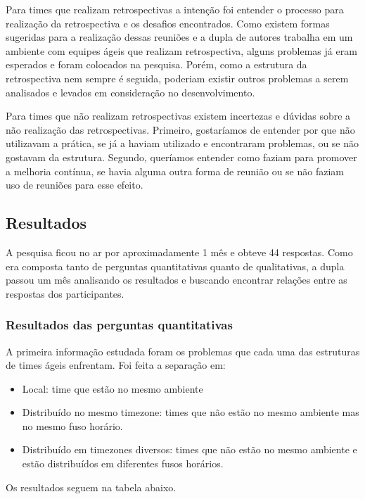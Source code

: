 Para times que realizam retrospectivas a intenção foi entender o processo para realização da retrospectiva e os desafios encontrados. Como existem formas sugeridas para a realização dessas reuniões e a dupla de autores trabalha em um ambiente com equipes ágeis que realizam retrospectiva, alguns problemas já eram esperados e foram colocados na pesquisa. Porém, como a estrutura da retrospectiva nem sempre é seguida, poderiam existir outros problemas a serem analisados e levados em consideração no desenvolvimento.

Para times que não realizam retrospectivas existem incertezas e dúvidas sobre a não realização das retrospectivas. Primeiro, gostaríamos de entender por que não utilizavam a prática, se já a haviam utilizado e encontraram problemas, ou se não gostavam da estrutura. Segundo, queríamos entender como faziam para promover a melhoria contínua, se havia alguma outra forma de reunião ou se não faziam uso de reuniões para esse efeito.

\subsection{Resultados}

A pesquisa ficou no ar por aproximadamente 1 mês e obteve 44 respostas. Como era composta tanto de perguntas quantitativas quanto de qualitativas, a dupla passou um mês analisando os resultados e buscando encontrar relações entre as respostas dos participantes.

\subsubsection*{Resultados das perguntas quantitativas}

A primeira informação estudada foram os problemas que cada uma das estruturas de times ágeis enfrentam. Foi feita a separação em:

\begin{itemize}
  \item Local: time que estão no mesmo ambiente
  \item Distribuído no mesmo timezone: times que não estão no mesmo ambiente mas no mesmo fuso horário.
  \item Distribuído em timezones diversos: times que não estão no mesmo ambiente e estão distribuídos em diferentes fusos horários.
\end{itemize}



Os resultados seguem na tabela abaixo.

